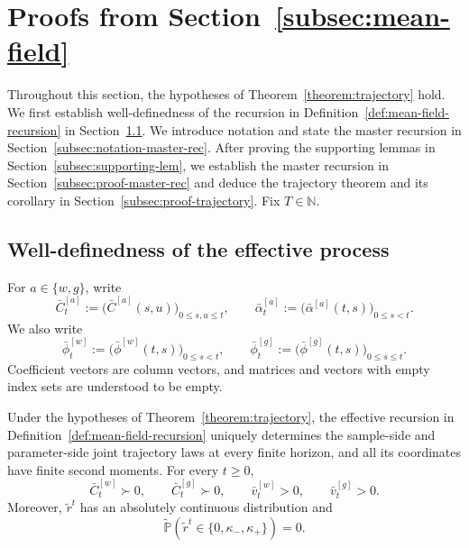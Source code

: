 \section{Proofs from Section~\ref{subsec:mean-field}}
\label{sec:proof-mean-field}

Throughout this section, the hypotheses of
Theorem~\ref{theorem:trajectory} hold.
We first establish well-definedness of the recursion in
Definition~\ref{def:mean-field-recursion}
in Section~\ref{subsec:well-definedness-effective}.
We introduce notation and state the master recursion in
Section~\ref{subsec:notation-master-rec}.
After proving the supporting lemmas in
Section~\ref{subsec:supporting-lem}, we establish the master
recursion in Section~\ref{subsec:proof-master-rec}
and deduce the trajectory theorem and its corollary in
Section~\ref{subsec:proof-trajectory}.
Fix $T\in\mathbb N$.

\subsection{Well-definedness of the effective process}
\label{subsec:well-definedness-effective}

For $a\in\{w,g\}$, write
\[
    \bar C_t^{[a]}
    :=
    \bigl(\bar C^{[a]}(s,u)\bigr)_{0\leq s,u\leq t},
    \qquad
    \bar\alpha_t^{[a]}
    :=
    \bigl(\bar\alpha^{[a]}(t,s)\bigr)_{0\leq s<t}.
\]
We also write
\[
    \bar\phi_t^{[w]}
    :=
    \bigl(\bar\phi^{[w]}(t,s)\bigr)_{0\leq s<t},
    \qquad
    \bar\phi_t^{[g]}
    :=
    \bigl(\bar\phi^{[g]}(t,s)\bigr)_{0\leq s\leq t}.
\]
Coefficient vectors are column vectors, and matrices and
vectors with empty index sets are understood to be empty.

\begin{lemma}
        \label{lemma:mf-proof-nondegeneracy}
        Under the hypotheses of Theorem~\ref{theorem:trajectory},
        the effective recursion in
        Definition~\ref{def:mean-field-recursion}
        uniquely determines the sample-side
        and parameter-side joint trajectory laws at every finite
        horizon, and all its coordinates have finite second moments. For every $t\geq0$,
        \[
            \bar C_t^{[w]}\succ0,
            \qquad
            \bar C_t^{[g]}\succ0,
            \qquad
            \bar v_t^{[w]}>0,
            \qquad
            \bar v_t^{[g]}>0.
        \]
        Moreover, $\tilde r^t$ has an absolutely continuous distribution and
        \[
            \tilde{\mathbb P}
            (\tilde r^t\in\{0,\kappa_-,\kappa_+\})=0.
        \]
        \end{lemma}

